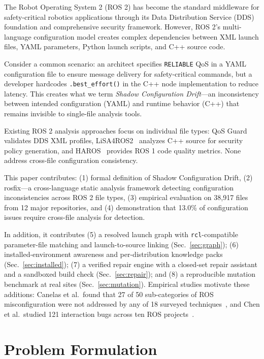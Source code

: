 \documentclass[conference]{IEEEtran}
\newcommand{\code}[1]{\texttt{#1}}
\begin{document}
The Robot Operating System 2 (ROS 2) has become the standard middleware for safety-critical
robotics applications through its Data Distribution Service (DDS) foundation and comprehensive
security framework. However, ROS 2's multi-language configuration model creates complex
dependencies between XML launch files, YAML parameters, Python launch scripts, and C++ source
code.

Consider a common scenario: an architect specifies \code{RELIABLE} QoS in a YAML configuration
file to ensure message delivery for safety-critical commands, but a developer hardcodes
\code{.best\_effort()} in the C++ node implementation to reduce latency. This creates what we
term \emph{Shadow Configuration Drift}---an inconsistency between intended configuration (YAML)
and runtime behavior (C++) that remains invisible to single-file analysis tools.

Existing ROS 2 analysis approaches focus on individual file types: QoS
Guard~\cite{lee2025qosguard} validates DDS XML profiles, LiSA4ROS2~\cite{zanatta2024lisa4ros2}
analyzes C++ source for security policy generation, and HAROS~\cite{santos2021haros} provides
ROS 1 code quality metrics. None address cross-file configuration consistency.

This paper contributes: (1) formal definition of Shadow Configuration Drift, (2) rosfix---a
cross-language static analysis framework detecting configuration inconsistencies across ROS 2
file types, (3) empirical evaluation on 38,917 files from 12 major repositories, and (4)
demonstration that 13.0\% of configuration issues require cross-file analysis for detection.

In addition, it contributes (5) a resolved launch graph with \code{rcl}-compatible parameter-file
matching and launch-to-source linking (Sec.~\ref{sec:graph}); (6) installed-environment
awareness and per-distribution knowledge packs (Sec.~\ref{sec:installed}); (7) a verified repair
engine with a closed-set repair assistant and a sandboxed build check (Sec.~\ref{sec:repair});
and (8) a reproducible mutation benchmark at real sites (Sec.~\ref{sec:mutation}). Empirical
studies motivate these additions: Canelas et al.\ found that 27 of 50 sub-categories of ROS
misconfiguration were not addressed by any of 18 surveyed techniques~\cite{canelas2024misconfig},
and Chen et al.\ studied 121 interaction bugs across ten ROS projects~\cite{chen2025ibugs}.

\section{Problem Formulation}
\end{document}

